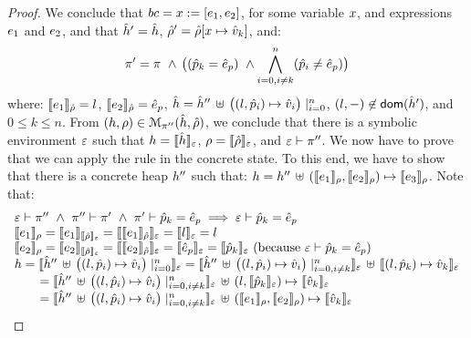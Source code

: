 \begin{proof}
\noindent{}
We conclude that $\bcmd = \jvar := [\jsilexpr_1, \jsilexpr_2]$, for some variable $\jvar$, and expressions $\jsilexpr_1$ and $\jsilexpr_2$, 
and that $\sheap' = \sheap$, $\sstore' = \sstore[\jvar \mapsto \sexprv_k]$, and: 
 $$\pc' =  \pc \ \wedge \, \big( (\sexprp_k = \sexpr_p) \ \wedge \bigwedge_{i = 0, i \neq k}^n (\sexprp_i \neq \sexpr_p) \big)$$
 where:
 $\symbeval{\jsilexpr_1}{\sstore} =  \loc$, $\symbeval{\jsilexpr_2}{\sstore} =  \sexpr_p$, 
 $\sheap = \sheap'' \, \uplus \, \big((l, \sexprp_i) \mapsto \sexprv_i\big)\mid_{i = 0}^n$, 
 $(l, -) \not\in \domain(\sheap')$, and $0 \leq k \leq n$. 
%
From $(\heap, \store) \in \smodels{\sheap, \sstore}{\pc''}$, we conclude that there is a symbolic environment
$\senv$ such that $\heap = \semexpr{\sheap}{\senv}$, $\store = \semexpr{\sstore}{\senv}$, and 
$\senv \vdash \pc''$. 
We now have to prove that we can apply the  rule in the concrete state.
To this end, we have to show that there is a concrete heap $\heap''$ such that:
$\heap = \heap'' \dunion \hcell{\symbeval{\jsilexpr_1}{\store}}{\symbeval{\jsilexpr_2}{\store}}{\symbeval{\jsilexpr_3}{\store}}$. 
Note that: 
$$
\begin{array}{l}
%
\senv \vdash \pc'' \ \wedge \ \pc'' \vdash \pc' \ \wedge \ \pc' \vdash \sexprp_k = \sexpr_p \implies \senv \vdash \sexprp_k = \sexpr_p \\
%
 \symbeval{\jsilexpr_1}{\store} = \symbeval{\jsilexpr_1}{\symbeval{\sstore}{\senv}} = \symbeval{\symbeval{\jsilexpr_1}{\sstore}}{\senv} 
    = \symbeval{\loc}{\senv} = \loc \\ 
  \symbeval{\jsilexpr_2}{\store}  = \symbeval{\jsilexpr_2}{\semexpr{\sstore}{\senv}} =  \symbeval{\symbeval{\jsilexpr_2}{\sstore}}{\senv}
   =  \symbeval{\sexpr_p}{\senv} = \symbeval{\sexprp_k}{\senv}  \text{ (because $\senv \vdash \sexprp_k = \sexpr_p$)} \\
 \heap = \semexpr{\sheap'' \, \uplus \, \big((l, \sexprp_i) \mapsto \sexprv_i\big)\mid_{i = 0}^n}{\senv} 
       =  \semexpr{\sheap'' \, \uplus \, \big((l, \sexprp_i) \mapsto \sexprv_i\big)\mid_{i = 0, i \neq k}^n}{\senv} \dunion \semexpr{(l, \sexprp_k) \mapsto \sexprv_k}{\senv} \\
         \qquad = \semexpr{\sheap'' \, \uplus \, \big((l, \sexprp_i) \mapsto \sexprv_i\big)\mid_{i = 0, i \neq k}^n}{\senv} \dunion (l, \semexpr{\sexprp_k}{\senv}) \mapsto \semexpr{\sexprv_k}{\senv}  \\ 
         \qquad =  \semexpr{\sheap'' \, \uplus \, \big((l, \sexprp_i) \mapsto \sexprv_i\big)\mid_{i = 0, i \neq k}^n}{\senv} \dunion (\symbeval{\jsilexpr_1}{\store}, \symbeval{\jsilexpr_2}{\store}) \mapsto \semexpr{\sexprv_k}{\senv}

\end{array}$$
\end{proof}
